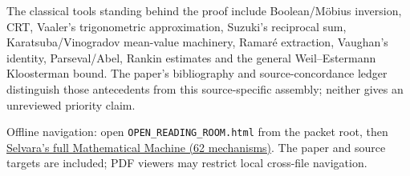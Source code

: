 \documentclass[11pt,letterpaper]{article}
\newcommand{\subtitle}[1]{{\sffamily\small\color{muted}#1}}
\begin{document}
The classical tools standing behind the proof include Boolean/M\"obius
inversion, CRT, Vaaler's trigonometric approximation, Suzuki's reciprocal
sum, Karatsuba/Vinogradov mean-value machinery, Ramar\'e extraction,
Vaughan's identity, Parseval/Abel, Rankin estimates and the general
Weil--Estermann Kloosterman bound. The paper's bibliography and
source-concordance ledger distinguish those antecedents from this
source-specific assembly; neither gives an unreviewed priority claim.

\subtitle{Offline navigation: open \texttt{OPEN\_READING\_ROOM.html} from the packet root, then \href{technique_atlas/index.html}{Selvara's full Mathematical Machine (62 mechanisms)}. The paper and source targets are included; PDF viewers may restrict local cross-file navigation.}\par
\end{document}
